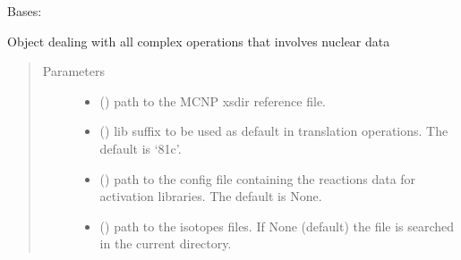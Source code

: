 \documentclass[letterpaper,10pt,english]{sphinxmanual}
\begin{document}
\begin{fulllineitems}
\label{\detokenize{api/initobjects:libmanager.LibManager}}
\sphinxAtStartPar
Bases: 

\sphinxAtStartPar
Object dealing with all complex operations that involves nuclear data
\begin{quote}\begin{description}
\item[{Parameters}] \leavevmode\begin{itemize}
\item {} 
\sphinxAtStartPar
{} () \textendash{} path to the MCNP xsdir reference file.

\item {} 
\sphinxAtStartPar
{} (\sphinxstyleliteralemphasis{\sphinxupquote{, }}) \textendash{} lib suffix to be used as default in translation operations.
The default is ‘81c’.

\item {} 
\sphinxAtStartPar
{} (\sphinxstyleliteralemphasis{\sphinxupquote{, }}) \textendash{} path to the config file containing the reactions data for
activation libraries. The default is None.

\item {} 
\sphinxAtStartPar
{} (\sphinxstyleliteralemphasis{\sphinxupquote{, }}) \textendash{} path to the isotopes files. If None (default) the file is searched
in the current directory.


\end{itemize}
\end{description}
\end{quote}
\end{fulllineitems}
\end{document}
